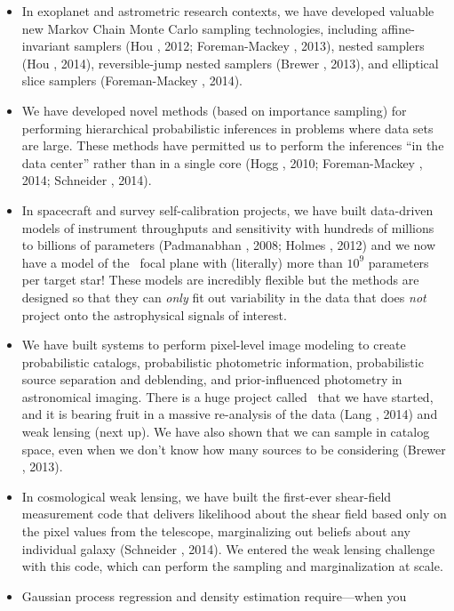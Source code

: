 \documentclass[12pt]{article}
\begin{document}
\begin{itemize}
\item
In exoplanet and astrometric research contexts, we have developed valuable new Markov
Chain Monte Carlo sampling technologies, including affine-invariant
samplers (Hou \etal, 2012; Foreman-Mackey \etal, 2013), nested
samplers (Hou \etal, 2014), reversible-jump nested samplers (Brewer
\etal, 2013), and elliptical slice samplers (Foreman-Mackey \etal,
2014).
\item
We have developed novel methods (based on importance sampling) for
performing hierarchical probabilistic inferences in problems where
data sets are large.  These methods have permitted us to perform the
inferences ``in the data center'' rather than in a single core (Hogg
\etal, 2010; Foreman-Mackey \etal, 2014; Schneider \etal, 2014).
\item
In spacecraft and survey self-calibration projects, we have built
data-driven models of instrument throughputs and sensitivity with
hundreds of millions to billions of parameters (Padmanabhan \etal,
2008; Holmes \etal, 2012) and we now have a model of the
\kepler\ focal plane with (literally) more than $10^9$ parameters per
target star!  These models are incredibly flexible but the methods are
designed so that they can \emph{only} fit out variability in the data
that does \emph{not} project onto the astrophysical signals of interest.
\item
We have built systems to perform pixel-level image modeling to create
probabilistic catalogs, probabilistic photometric information,
probabilistic source separation and deblending, and prior-influenced
photometry in astronomical imaging.  There is a huge project called
\thetractor\ that we have started, and it is bearing fruit in a
massive re-analysis of the  data (Lang \etal, 2014) and weak
lensing (next up).  We have also shown that we can sample in catalog
space, even when we don't know how many sources to be considering (Brewer \etal, 2013).
\item
In cosmological weak lensing, we have built the first-ever shear-field
measurement code that delivers likelihood about the shear field based
only on the pixel values from the telescope, marginalizing out beliefs
about any individual galaxy (Schneider \etal, 2014).  We entered the
 weak lensing challenge with this code, which can
perform the sampling and marginalization at scale.
\item
Gaussian process regression and density estimation require---when you

\end{itemize}
\end{document}
